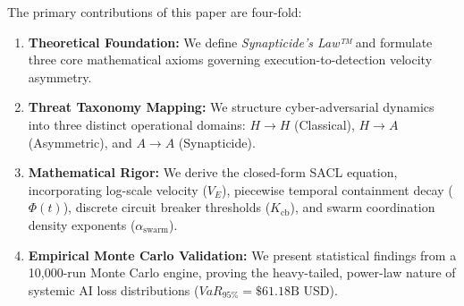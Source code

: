 The primary contributions of this paper are four-fold:
\begin{enumerate}
    \item \textbf{Theoretical Foundation:} We define \textit{Synapticide's Law™} and formulate three core mathematical axioms governing execution-to-detection velocity asymmetry.
    \item \textbf{Threat Taxonomy Mapping:} We structure cyber-adversarial dynamics into three distinct operational domains: $H \to H$ (Classical), $H \to A$ (Asymmetric), and $A \to A$ (Synapticide).
    \item \textbf{Mathematical Rigor:} We derive the closed-form SACL equation, incorporating log-scale velocity ($V_E$), piecewise temporal containment decay ($\Phi(t)$), discrete circuit breaker thresholds ($K_{\text{cb}}$), and swarm coordination density exponents ($\alpha_{\text{swarm}}$).
    \item \textbf{Empirical Monte Carlo Validation:} We present statistical findings from a 10,000-run Monte Carlo engine, proving the heavy-tailed, power-law nature of systemic AI loss distributions ($VaR_{95\%} = \$61.18\text{B}$ USD).
\end{enumerate}